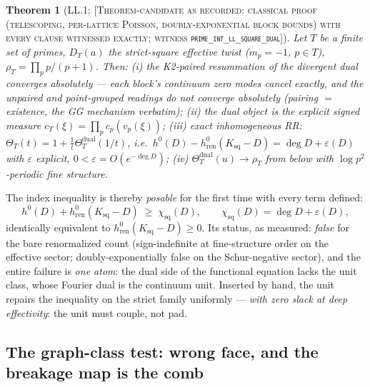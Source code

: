 \documentclass[11pt,reqno]{amsart}
\theoremstyle{plain}
\newtheorem{theorem}{Theorem}[section]
\theoremstyle{definition}
\theoremstyle{remark}
\newcommand{\grade}[1]{\textup{[\textsc{#1}]}}
\begin{document}
\begin{theorem}[LL.1; \grade{Theorem-candidate as recorded: classical proof (telescoping,
per-lattice Poisson, doubly-exponential block bounds) with every clause witnessed exactly;
witness \texttt{prime\_\allowbreak int\_\allowbreak ll\_\allowbreak square\_\allowbreak dual}}]\label{thm:ll}
Let $T$ be a finite set of primes, $D_T(a)$ the strict-square effective twist ($m_p = -1$,
$p \in T$), $\rho_T = \prod_p p/(p+1)$. Then: \textup{(i)} the K2-paired resummation of the
divergent dual converges absolutely --- each block's continuum zero modes cancel exactly, and
the unpaired and point-grouped readings do not converge absolutely (\emph{pairing $=$
existence}, the GG mechanism verbatim); \textup{(ii)} the dual object is the explicit signed
measure $c_T(\xi) = \prod_p c_p(v_p(\xi))$; \textup{(iii)} exact inhomogeneous RR:
$\Theta_T(t) = 1 + \tfrac{1}{t}\Theta_T^{\mathrm{dual}}(1/t)$, i.e.\
$h^0(D) - h^0_{\mathrm{ren}}(K_{\mathrm{sq}} - D) = \deg D + \varepsilon(D)$ with
$\varepsilon$ explicit, $0 < \varepsilon = O(e^{-\deg D})$; \textup{(iv)}
$\Theta_T^{\mathrm{dual}}(u) \to \rho_T$ from below with $\log p^2$-periodic fine structure.
\end{theorem}

The index inequality is thereby \emph{posable} for the first time with every term defined:
\[
h^0(D) + h^0_{\mathrm{ren}}(K_{\mathrm{sq}} - D) \;\ge\; \chi_{\mathrm{sq}}(D),
\qquad \chi_{\mathrm{sq}}(D) = \deg D + \varepsilon(D),
\]
identically equivalent to $h^0_{\mathrm{ren}}(K_{\mathrm{sq}} - D) \ge 0$. Its status, as
measured: \emph{false} for the bare renormalized count (sign-indefinite at fine-structure
order on the effective sector; doubly-exponentially false on the Schur-negative sector), and
the entire failure is \emph{one atom}: the dual side of the functional equation lacks the
unit class, whose Fourier dual is the continuum unit. Inserted by hand, the unit repairs the
inequality on the strict family uniformly --- \emph{with zero slack at deep effectivity}: the
unit must couple, not pad.

\subsection{The graph-class test: wrong face, and the breakage map is the comb}
\label{subsec:nn}
\end{document}

